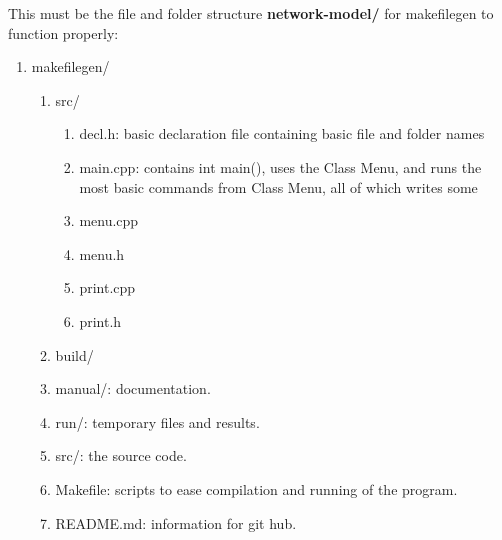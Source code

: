 	This must be the file and folder structure \textbf{network-model/} for makefilegen to function properly:
	\begin{enumerate}
		\item makefilegen/
			\begin{enumerate}
				\item src/
					\begin{enumerate}
						\item decl.h: basic declaration file containing basic file and folder names
						\item main.cpp: contains int main(), uses the Class Menu, and runs the most basic commands from Class Menu, all of which writes some
						\item menu.cpp
						\item menu.h
						\item print.cpp
						\item print.h
					\end{enumerate}
				\item build/
		\item manual/: documentation.
		\item run/: temporary files and results.
		\item src/: the source code.
		\item Makefile: scripts to ease compilation and running of the program.
		\item README.md: information for git hub.
	\end{enumerate}
	\end{enumerate}
